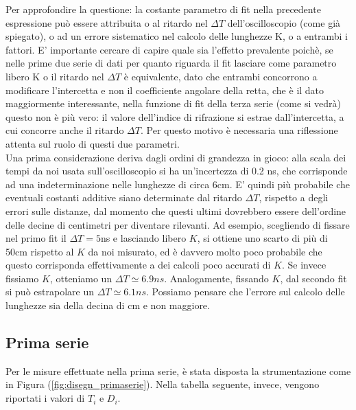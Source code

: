 \documentclass[journal, a4paper]{IEEEtran}
\begin{document}
Per approfondire la questione: la costante parametro di fit nella precedente espressione può essere attribuita o al ritardo nel $\Delta T$ dell'oscilloscopio (come già spiegato), o ad un errore sistematico nel calcolo delle lunghezze K, o a entrambi i fattori. E' importante cercare di capire quale sia l'effetto prevalente poichè, se nelle prime due serie di dati per quanto riguarda il fit lasciare come parametro libero K o il ritardo nel $\Delta T$ è equivalente, dato che entrambi concorrono a modificare l'intercetta e non il coefficiente angolare della retta, che è il dato maggiormente interessante, nella funzione di fit della terza serie (come si vedrà) questo non è più vero: il valore dell'indice di rifrazione si estrae dall'intercetta, a cui concorre anche il ritardo $\Delta T$. Per questo motivo è necessaria una riflessione attenta sul ruolo di questi due parametri.\\
Una prima considerazione deriva dagli ordini di grandezza in gioco: alla scala dei tempi da noi usata sull'oscilloscopio si ha un'incertezza di 0.2 ns, che corrisponde ad una indeterminazione nelle lunghezze di circa 6cm. E' quindi più probabile che eventuali costanti additive siano determinate dal ritardo $\Delta T$, rispetto a degli errori sulle distanze, dal momento che questi ultimi dovrebbero essere dell'ordine delle decine di centimetri per diventare rilevanti. Ad esempio, scegliendo di fissare nel primo fit il $\Delta T = 5$ns e lasciando libero $K$, si ottiene uno scarto di più di 50cm rispetto al $K$ da noi misurato, ed è davvero molto poco probabile che questo corrisponda effettivamente a dei calcoli poco accurati di $K$. Se invece fissiamo $K$, otteniamo un $\Delta T \simeq 6.9 ns$. Analogamente, fissando $K$, dal secondo fit si può estrapolare un $\Delta T \simeq 6.1 ns$. Possiamo pensare che l'errore sul calcolo delle lunghezze sia della decina di cm e non maggiore.



\subsection{Prima serie}
Per le misure effettuate nella prima serie, è stata disposta la strumentazione come in Figura (\ref{fig:disegn_primaserie}). Nella tabella seguente, invece, vengono riportati i valori di $T_i$ e $D_i$.
\end{document}
